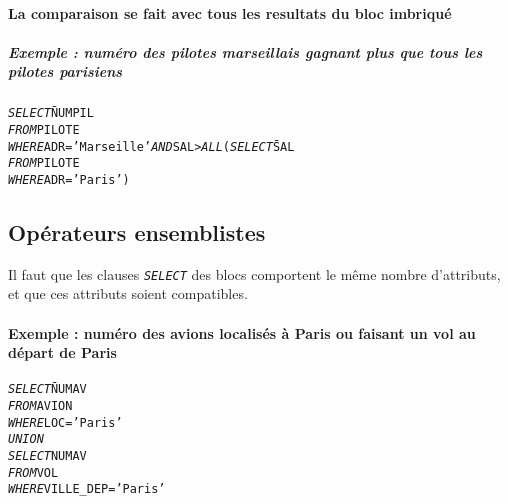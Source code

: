 \documentclass[10pt]{article}
\begin{document}
				\paragraph{La comparaison se fait avec tous les resultats du bloc imbriqué}
					\subparagraph{Exemple : numéro des pilotes marseillais gagnant plus que tous les pilotes parisiens}
						\begin{alltt}
							\begin{tabbing}
								\emph{SELECT} \= NUMPIL\\
								\emph{FROM} \> PILOTE\\
								\emph{WHERE} \> ADR='Marseille' \emph{AND} SAL > \emph{ALL} (\=\emph{SELECT} \= SAL\\
																						\>\>\emph{FROM} \> PILOTE\\
																						\>\>\emph{WHERE} \> ADR='Paris')\\
							\end{tabbing}
						\end{alltt}
						
		\subsection{Opérateurs ensemblistes}
			Il faut que les clauses \emph{\texttt{SELECT}} des blocs comportent le même nombre d'attributs, et que ces attributs soient compatibles.
			
			\paragraph{Exemple : numéro des avions localisés à Paris ou faisant un vol au départ de Paris}\index{UNION}
				\begin{alltt}
					\begin{tabbing}
						\emph{SELECT} \= NUMAV\\
						\emph{FROM} \> AVION\\
						\emph{WHERE} \> LOC='Paris'\\
						\emph{UNION}\\
						\emph{SELECT} \> NUMAV\\
						\emph{FROM} \> VOL\\
						\emph{WHERE} \> VILLE_DEP='Paris'
					\end{tabbing}
				\end{alltt}
				
\end{document}

